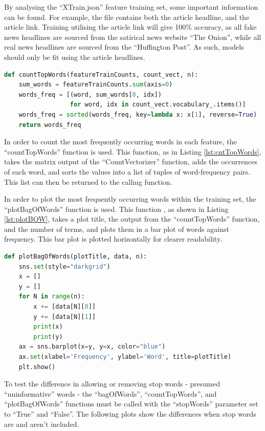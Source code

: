 By analysing the ``XTrain.json'' feature training set, some important
information can be found. For example, the file contains both the article
headline, and the article link. Training utilising the article link will give
100\% accuracy, as all fake news headlines are sourced from the satirical news
website ``The Onion'', while all real news headlines are sourced from the
``Huffington Post''. As such, models should only be fit using the article
headlines.

\begin{lstlisting}[language=Python, caption={``countTopWords'' Function},
label={lst:cntTopWords}]
def countTopWords(featureTrainCounts, count_vect, n):
    sum_words = featureTrainCounts.sum(axis=0)
    words_freq = [(word, sum_words[0, idx])
                  for word, idx in count_vect.vocabulary_.items()]
    words_freq = sorted(words_freq, key=lambda x: x[1], reverse=True)
    return words_freq
\end{lstlisting}

In order to count the most frequently occurring words in each feature, the
``countTopWords'' function is used. This function, as in Listing
\ref{lst:cntTopWords}, takes the matrix output of the ``CountVectorizer''
function, adds the occurrences of each word, and sorts the values into a list of
tuples of word-frequency pairs\cite{boujon_2019}. This list can then be returned
to the calling function.

In order to plot the most frequently occurring words within the training set,
the ``plotBagOfWords'' function is used. This function , as shown in Listing
\ref{lst:plotBOW}, takes a plot title, the
output from the ``countTopWords'' function, and the number of terms, and plots
them in a bar plot of words against frequency. This bar plot is plotted
horizontally for clearer readability.

\begin{lstlisting}[language=Python, caption={``plotBagOfWords'' Function},
label={lst:plotBOW}]
def plotBagOfWords(plotTitle, data, n):
    sns.set(style="darkgrid")
    x = []
    y = []
    for N in range(n):
        x += [data[N][0]]
        y += [data[N][1]]
        print(x)
        print(y)
    ax = sns.barplot(x=y, y=x, color="blue")
    ax.set(xlabel='Frequency', ylabel='Word', title=plotTitle)
    plt.show()
\end{lstlisting}

To test the difference in allowing or removing stop words - presumed
``uninformative'' words\cite{} - the ``bagOfWords'', ``countTopWords'', and
``plotBagOfWords'' functions must be called with the ``stopWords'' parameter set
to ``True'' and ``False''. The following plots show the differences when stop
words are and aren't included.

